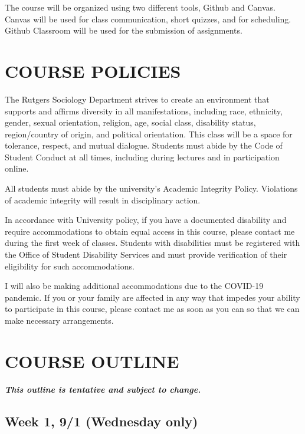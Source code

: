 \documentclass[
  10pt,
]{article}
\begin{document}
The course will be organized using two different tools, Github and
Canvas. Canvas will be used for class communication, short quizzes, and
for scheduling. Github Classroom will be used for the submission of
assignments.

\hypertarget{course-policies}{%
\section{COURSE POLICIES}\label{course-policies}}

The Rutgers Sociology Department strives to create an environment that
supports and affirms diversity in all manifestations, including race,
ethnicity, gender, sexual orientation, religion, age, social class,
disability status, region/country of origin, and political orientation.
This class will be a space for tolerance, respect, and mutual dialogue.
Students must abide by the Code of Student Conduct at all times,
including during lectures and in participation online.

All students must abide by the university's Academic Integrity Policy.
Violations of academic integrity will result in disciplinary action.

In accordance with University policy, if you have a documented
disability and require accommodations to obtain equal access in this
course, please contact me during the first week of classes. Students
with disabilities must be registered with the Office of Student
Disability Services and must provide verification of their eligibility
for such accommodations.

I will also be making additional accommodations due to the COVID-19
pandemic. If you or your family are affected in any way that impedes
your ability to participate in this course, please contact me as soon as
you can so that we can make necessary arrangements.

\hypertarget{course-outline}{%
\section{COURSE OUTLINE}\label{course-outline}}

\textbf{\emph{This outline is tentative and subject to change.}}

\hypertarget{week-1-91-wednesday-only}{%
\subsection{Week 1, 9/1 (Wednesday
only)}\label{week-1-91-wednesday-only}}
\end{document}
